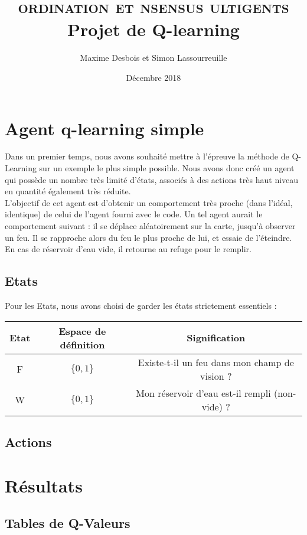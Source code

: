 \documentclass{article}
\title{%
    \vspace*{\fill}
    \textbf{\scshape \tcol{Co}ordination et \tcol{Co}nsensus \tcol{M}ulti\tcol{A}gents}\\
    Projet de Q-learning
}
\author{
    Maxime Desbois et Simon Lassourreuille
}
\date{
    Décembre 2018
    \vspace*{\fill}
}
\begin{document}
\maketitle

\clearpage

\section{Agent q-learning simple}

Dans un premier temps, nous avons souhaité mettre à l'épreuve la méthode de Q-Learning sur un exemple le plus simple possible. Nous avons donc créé un agent qui possède un nombre très limité d'états, associés à des actions très haut niveau en quantité également très réduite.\\
L'objectif de cet agent est d'obtenir un comportement très proche (dans l'idéal, identique) de celui de l'agent fourni avec le code. Un tel agent aurait le comportement suivant : il se déplace aléatoirement sur la carte, jusqu'à observer un feu. Il se rapproche alors du feu le plus proche de lui, et essaie de l'éteindre. En cas de réservoir d'eau vide, il retourne au refuge pour le remplir.

\subsection{Etats}

Pour les Etats, nous avons choisi de garder les états strictement essentiels :

\begin{tabular}{|c|c|c|}
    \hline
    Etat & Espace de définition & Signification \\
    \hline
    F      & $\{0, 1\}$ & Existe-t-il un feu dans mon champ de vision ?\\
    \hline
    W      & $\{0, 1\}$ & Mon réservoir d'eau est-il rempli (non-vide) ?\\
    \hline
\end{tabular}

\subsection{Actions}

\section{Résultats}

\subsection{Tables de Q-Valeurs}
\end{document}
